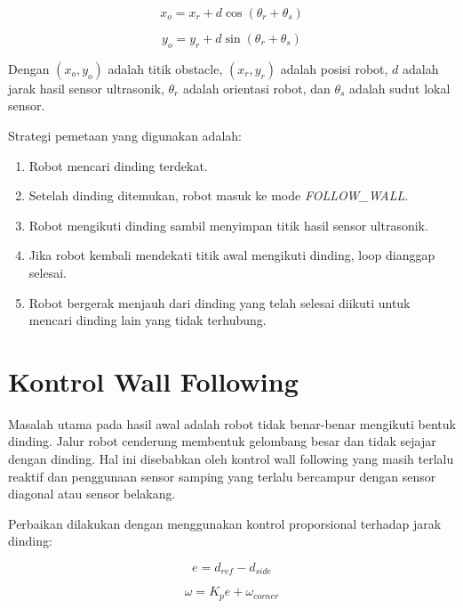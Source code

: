 \documentclass{article}
\begin{document}
\begin{equation}
    x_o = x_r + d \cos(\theta_r + \theta_s)
\end{equation}

\begin{equation}
    y_o = y_r + d \sin(\theta_r + \theta_s)
\end{equation}

Dengan $(x_o, y_o)$ adalah titik obstacle, $(x_r, y_r)$ adalah posisi robot, $d$ adalah jarak hasil sensor ultrasonik, $\theta_r$ adalah orientasi robot, dan $\theta_s$ adalah sudut lokal sensor.

Strategi pemetaan yang digunakan adalah:

\begin{enumerate}[itemsep=0.2em]
    \item Robot mencari dinding terdekat.
    \item Setelah dinding ditemukan, robot masuk ke mode \textit{FOLLOW\_WALL}.
    \item Robot mengikuti dinding sambil menyimpan titik hasil sensor ultrasonik.
    \item Jika robot kembali mendekati titik awal mengikuti dinding, loop dianggap selesai.
    \item Robot bergerak menjauh dari dinding yang telah selesai diikuti untuk mencari dinding lain yang tidak terhubung.
\end{enumerate}

\section{Kontrol Wall Following}

Masalah utama pada hasil awal adalah robot tidak benar-benar mengikuti bentuk dinding. Jalur robot cenderung membentuk gelombang besar dan tidak sejajar dengan dinding. Hal ini disebabkan oleh kontrol wall following yang masih terlalu reaktif dan penggunaan sensor samping yang terlalu bercampur dengan sensor diagonal atau sensor belakang.

Perbaikan dilakukan dengan menggunakan kontrol proporsional terhadap jarak dinding:

\begin{equation}
    e = d_{ref} - d_{side}
\end{equation}

\begin{equation}
    \omega = K_p e + \omega_{corner}
\end{equation}
\end{document}
